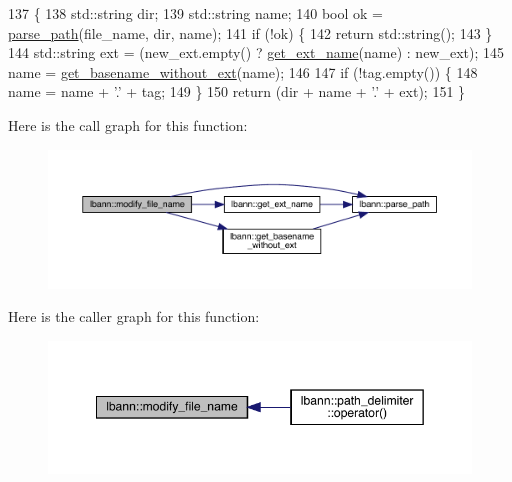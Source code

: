 \begin{DoxyCode}
137                                                                                                     \{
138   std::string dir;
139   std::string name;
140   \textcolor{keywordtype}{bool} ok = \hyperlink{namespacelbann_a1ce6832a54235a5fb333f50fffbe1b63}{parse\_path}(file\_name, dir, name);
141   \textcolor{keywordflow}{if} (!ok) \{
142     \textcolor{keywordflow}{return} std::string();
143   \}
144   std::string ext = (new\_ext.empty() ? \hyperlink{namespacelbann_ad9a28639b0953886bbcb7fc366783a17}{get\_ext\_name}(name) : new\_ext);
145   name = \hyperlink{namespacelbann_aea9a4378326fd51236a8343c43cc4a7c}{get\_basename\_without\_ext}(name);
146 
147   \textcolor{keywordflow}{if} (!tag.empty()) \{
148     name = name + \textcolor{charliteral}{'.'} + tag;
149   \}
150   \textcolor{keywordflow}{return} (dir + name + \textcolor{charliteral}{'.'} + ext);
151 \}
\end{DoxyCode}
Here is the call graph for this function\+:\nopagebreak
\begin{figure}[H]
\begin{center}
\leavevmode
\includegraphics[width=350pt]{namespacelbann_a351610c8df00514e8942756c2099fedc_cgraph}
\end{center}
\end{figure}
Here is the caller graph for this function\+:\nopagebreak
\begin{figure}[H]
\begin{center}
\leavevmode
\includegraphics[width=349pt]{namespacelbann_a351610c8df00514e8942756c2099fedc_icgraph}
\end{center}
\end{figure}
\mbox{\label{namespacelbann_a6084b9319eea1997f8446fa3e6879532}} 
